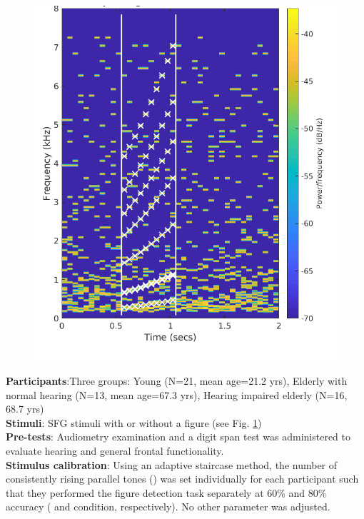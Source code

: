 \documentclass[a0,portrait]{a0poster}
\begin{document}
\begin{multicols}{2}
\setlength{\columnsep}{60pt}
\begin{figure}
	\begin{center}
		\includegraphics[width=1\linewidth]{sfg_stimulus.png}
		\label{fig:stimulus}
	\end{center}
\end{figure}

\textbf{Participants}:Three groups: Young (N=21, mean age=21.2 yrs), Elderly with normal hearing (N=13, mean age=67.3 yrs), Hearing impaired elderly (N=16, 68.7 yrs)\\
\textbf{Stimuli}: SFG stimuli with or without a figure (see Fig. \ref{fig:stimulus})\\
\textbf{Pre-tests}: Audiometry examination and a digit span test was administered to evaluate hearing and general frontal functionality.\\
\textbf{Stimulus calibration}: Using an adaptive staircase method, the number of consistently rising parallel tones () was set individually for each participant such that they performed the figure detection task separately at 60\% and 80\% accuracy ( and  condition, respectively). No other parameter was adjusted.


\end{multicols}
\end{document}
